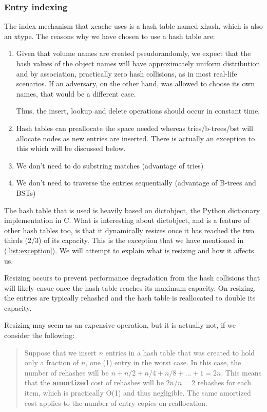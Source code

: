 \subsubsection{Entry indexing}\label{sec:xcache-index-design}

The index mechanism that xcache uses is a hash table named xhash, which is also 
an xtype. The reasons why we have chosen to use a hash table are:

\begin{enumerate}
	\item Given that volume names are created pseudorandomly, we expect 
		that the hash values of the object names will have 
		approximately uniform distribution and by association, 
		practically zero hash collisions, as in most real-life 
		scenarios. If an adversary, on the other hand, was allowed to 
		choose its own names, that would be a different case.

		Thus, the insert, lookup and delete operations should occur in 
		constant time.
	\item Hash tables can preallocate the space needed whereas 
		tries/b-trees/bst will allocate nodes as new entries are 
		inserted. There is actually an exception to this which will be 
		discussed below. \label{list:exception}
	\item We don't need to do substring matches (advantage of tries)
	\item We don't need to traverse the entries sequentially (advantage of 
		B-trees and BSTs)
\end{enumerate}

The hash table that is used is heavily based on dictobject\cite{dictobject},
the Python dictionary implementation in C. What is interesting about 
dictobject, and is a feature of other hash tables too, is that it dynamically
resizes once it has reached the two thirds (2/3) of its capacity. This is the 
exception that we have mentioned in (\ref{list:exception}). We will attempt to 
explain what is resizing and how it affects us.

Resizing occurs to prevent performance degradation from the hash collisions 
that will likely ensue once the hash table reaches its maximum capacity. On 
resizing, the entries are typically rehashed and the hash table is reallocated 
to double its capacity.

Resizing may seem as an expensive operation, but it is actually not, if we 
consider the following:
\begin{quotation}
\cite{hash-resize}Suppose that we insert \(n\) entries in a hash table that was 
created to hold only a fraction of \(n\), one (1) entry in the worst case. In 
this case, the number of rehashes will be \(n + n/2 + n/4 + n/8 + ... + 1 = 
	2n\).  This means that the \textbf{amortized} cost of rehashes will be 
\(2n/n = 2\) rehashes for each item, which is practically O(1) and thus 
negligible.  The same amortized cost applies to the number of entry copies on 
reallocation.
\end{quotation}

